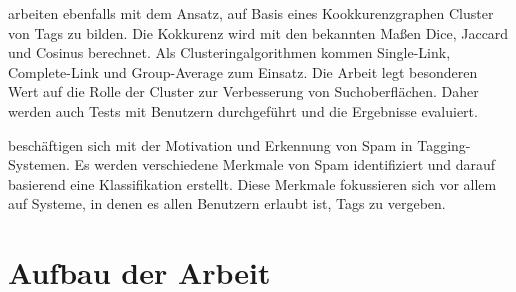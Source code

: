 \textcite{kss2010} arbeiten ebenfalls mit dem Ansatz, auf Basis eines Kookkurenzgraphen Cluster von Tags zu bilden. Die Kokkurenz wird mit den bekannten Maßen Dice, Jaccard und Cosinus berechnet. Als Clusteringalgorithmen kommen Single-Link, Complete-Link und Group-Average zum Einsatz. Die Arbeit legt besonderen Wert auf die Rolle der Cluster zur Verbesserung von Suchoberflächen. Daher werden auch Tests mit Benutzern durchgeführt und die Ergebnisse evaluiert.

\textcite{mcf2009} beschäftigen sich mit der Motivation und Erkennung von Spam in Tagging-Systemen. Es werden verschiedene Merkmale von Spam identifiziert und darauf basierend eine Klassifikation erstellt. Diese Merkmale fokussieren sich vor allem auf Systeme, in denen es allen Benutzern erlaubt ist, Tags zu vergeben.

\section{Aufbau der Arbeit}